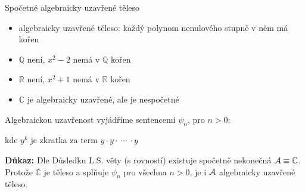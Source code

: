 \documentclass{beamer}
\begin{document}
\begin{frame}{Spočetné algebraicky uzavřené těleso}

    \begin{itemize}
        \item \alert{algebraicky uzavřené} těleso: každý polynom nenulového stupně v něm má kořen
        \item $\mathbb Q$ není, $x^2-2$ nemá v $\mathbb Q$ kořen
        \item $\mathbb R$ není, $x^2+1$ nemá v $\mathbb R$ kořen
        \item $\mathbb C$ je algebraicky uzavřené, ale je nespočetné
    \end{itemize}

    Algebraickou uzavřenost vyjádříme sentencemi $\psi_n$, pro $n>0$:
    

    kde $y^k$ je zkratka za term $y\cdot y \cdot\ \cdots\ \cdot y$


    \smallskip

    \textbf{Důkaz:}
    Dle Důsledku L.S. věty (s rovností) existuje spočetně nekonečná $\mathcal{A}\equiv\mathbb C$. Protože $\mathbb C$ je těleso a splňuje $\psi_n$ pro všechna $n>0$, je i $\mathcal{A}$ algebraicky uzavřené těleso.\hfill\qedsymbol

\end{frame}
\end{document}
